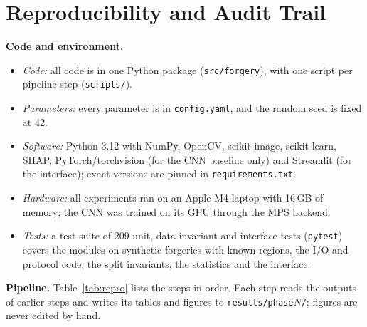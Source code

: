 \section{Reproducibility and Audit Trail}\label{app:repro}

\textbf{Code and environment.}
\begin{itemize}\setlength\itemsep{0pt}
\item \emph{Code:} all code is in one Python package (\texttt{src/forgery}), with one script per pipeline step
(\texttt{scripts/}).
\item \emph{Parameters:} every parameter is in \texttt{config.yaml}, and the random seed is fixed at 42.
\item \emph{Software:} Python 3.12 with NumPy, OpenCV, scikit-image, scikit-learn, SHAP, PyTorch/torchvision (for
the CNN baseline only) and Streamlit (for the interface); exact versions are pinned in \texttt{requirements.txt}.
\item \emph{Hardware:} all experiments ran on an Apple M4 laptop with 16\,GB of memory; the CNN was trained on
its GPU through the MPS backend.
\item \emph{Tests:} a test suite of 209 unit, data-invariant and interface tests (\texttt{pytest}) covers the
modules on synthetic forgeries with known regions, the I/O and protocol code, the split invariants, the statistics
and the interface.
\end{itemize}

\textbf{Pipeline.} Table~\ref{tab:repro} lists the steps in order. Each step reads the outputs of earlier steps and
writes its tables and figures to \texttt{results/phase$N$/}; figures are never edited by hand.

